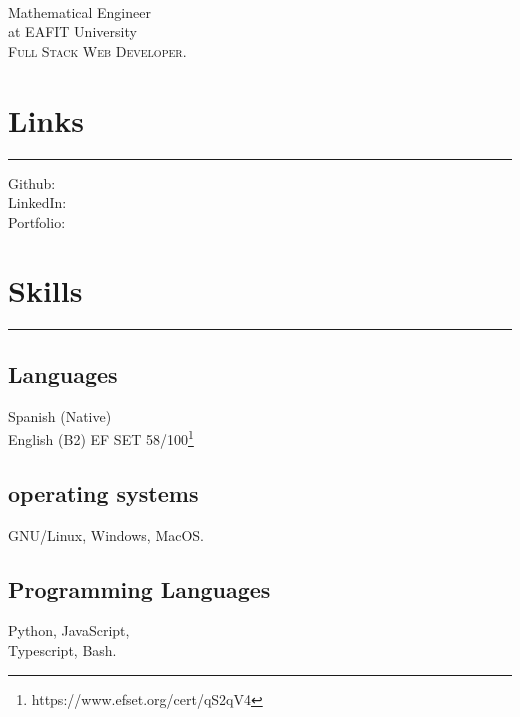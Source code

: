 \documentclass[]{rahulworld-resume}
\begin{document}
%
%

\begin{minipage}[t]{0.33\textwidth}
\begin{large}
\\
\end{large}
Mathematical Engineer\\
at EAFIT University\\
\textsc{Full Stack Web Developer.}


\section{Links}
\noindent\rule{5cm}{0.4pt}

Github: \href{https://github.com/jamerrq}{} \\
LinkedIn: \href{https://www.linkedin.com/in/jamerrq}{} \\
Portfolio: \href{https://my-portfolio-jamerrq.netlify.app/}{}
\section{Skills}
\noindent\rule{5cm}{0.4pt}
\subsection{Languages}
Spanish (Native)\\
English (B2) EF SET 58/100\footnote{https://www.efset.org/cert/qS2qV4}\\
\vspace{1pt}
\subsection{operating systems}
GNU/Linux, Windows, MacOS.\\
\vspace{1pt}
\subsection{Programming Languages}
Python, JavaScript, \\
Typescript, Bash. \\
\vspace{1pt}

\end{minipage}
\end{document}
